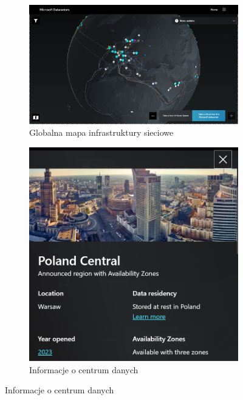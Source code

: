 \begin{figure}[H]
    \begin{subfigure}[m]{0.6\textwidth}
    \includegraphics[width=\textwidth]{images/azure-ic}
    \caption{Globalna mapa infrastruktury sieciowe}
    \end{subfigure}
    \hfill
    \begin{subfigure}[m]{0.35\textwidth}
        \includegraphics[width=\textwidth]{images/azure-pl}
        \caption{Informacje o centrum danych}
    \end{subfigure}
    \label{fig:azure-ic}
\end{figure}

